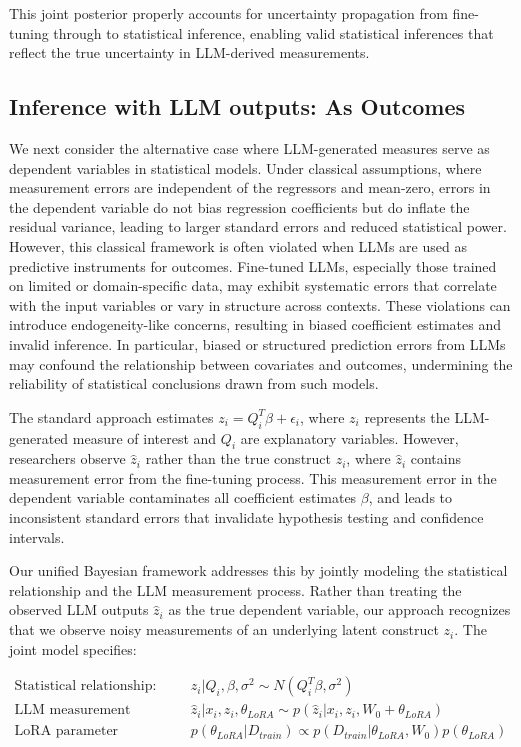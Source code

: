 \documentclass[11pt]{article}
\begin{document}
This joint posterior properly accounts for uncertainty propagation from fine-tuning through to statistical inference, enabling valid statistical inferences that reflect the true uncertainty in LLM-derived measurements.

\subsection{Inference with LLM outputs: As Outcomes}

We next consider the alternative case where LLM-generated measures serve as dependent variables in statistical models. Under classical assumptions, where measurement errors are independent of the regressors and mean-zero, errors in the dependent variable do not bias regression coefficients but do inflate the residual variance, leading to larger standard errors and reduced statistical power. However, this classical framework is often violated when LLMs are used as predictive instruments for outcomes. Fine-tuned LLMs, especially those trained on limited or domain-specific data, may exhibit systematic errors that correlate with the input variables or vary in structure across contexts. These violations can introduce endogeneity-like concerns, resulting in biased coefficient estimates and invalid inference. In particular, biased or structured prediction errors from LLMs may confound the relationship between covariates and outcomes, undermining the reliability of statistical conclusions drawn from such models.

The standard approach estimates $z_i = Q_i^T\beta + \epsilon_i$, where $z_i$ represents the LLM-generated measure of interest and $Q_i$ are explanatory variables. However, researchers observe $\hat{z}_i$ rather than the true construct $z_i$, where $\hat{z}_i$ contains measurement error from the fine-tuning process. This measurement error in the dependent variable contaminates all coefficient estimates $\beta$, and leads to inconsistent standard errors that invalidate hypothesis testing and confidence intervals.

Our unified Bayesian framework addresses this by jointly modeling the statistical relationship and the LLM measurement process. Rather than treating the observed LLM outputs $\hat{z}_i$ as the true dependent variable, our approach recognizes that we observe noisy measurements of an underlying latent construct $z_i$. The joint model specifies:

\begin{align}
\text{Statistical relationship:} \quad &z_i|Q_i, \beta, \sigma^2 \sim N(Q_i^T\beta, \sigma^2) \label{eq:stat_relationship} \\
\text{LLM measurement process:} \quad &\hat{z}_i|x_i, z_i, \theta_{LoRA} \sim p(\hat{z}_i|x_i, z_i, W_0 + \theta_{LoRA}) \label{eq:llm_measurement} \\
\text{LoRA parameter posterior:} \quad &p(\theta_{LoRA}|D_{train}) \propto p(D_{train}|\theta_{LoRA}, W_0)p(\theta_{LoRA}) \label{eq:lora_posterior2}
\end{align}
\end{document}
